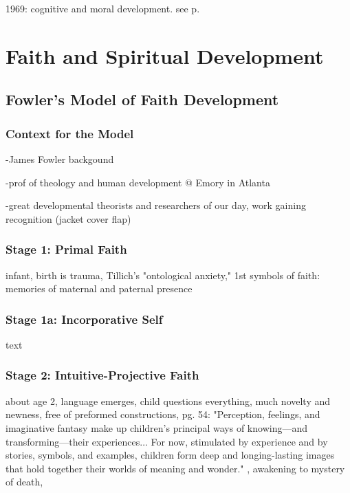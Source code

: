 1969: cognitive and moral development. see p.\pageref{sec:Kohl}


\section{Faith and Spiritual Development}


\subsection{Fowler's Model of Faith Development}

\subsubsection{Context for the Model}

-James Fowler backgound

      -prof of theology and human development @ Emory in Atlanta

      -great developmental theorists and researchers of our day, work gaining recognition (jacket cover flap) 

\subsubsection{Stage 1: Primal Faith}

infant, birth is trauma, Tillich's "ontological anxiety," 1st symbols of faith: memories of maternal and paternal presence

\subsubsection{Stage 1a: Incorporative Self}

text

\subsubsection{Stage 2: Intuitive-Projective Faith}

about age 2, language emerges, child questions everything, much novelty and newness, free of preformed constructions, pg. 54: "Perception, feelings, and imaginative fantasy make up children's principal ways of knowing---and transforming---their experiences$\ldots$ For now, stimulated by experience and by stories, symbols, and examples, children form deep and longing-lasting images that hold together their worlds of meaning and wonder." , awakening to mystery of death,

